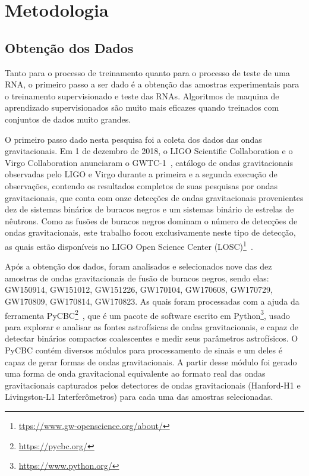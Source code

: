 \chapter{Metodologia}

\section{Obtenção dos Dados}

Tanto para o processo de treinamento quanto para o processo de teste de uma RNA, o primeiro passo a ser dado é a obtenção das amostras experimentais para o treinamento supervisionado e teste das RNAs. Algoritmos de maquina de aprendizado supervisionados são muito mais eficazes quando treinados com conjuntos de dados muito grandes.

O primeiro passo dado nesta pesquisa foi a coleta dos dados das ondas gravitacionais. Em 1 de dezembro de 2018, o LIGO Scientific Collaboration e o Virgo Collaboration anunciaram o GWTC-1~\cite{Abbott_2019}, catálogo de ondas gravitacionais observadas pelo LIGO e Virgo durante a primeira e a segunda execução de observações, contendo os resultados completos de suas pesquisas por ondas gravitacionais, que conta com onze detecções de ondas gravitacionais provenientes dez de sistemas binários de buracos negros e um sistemas binário de estrelas de nêutrons. Como as fusões de buracos negros dominam o número de detecções de ondas gravitacionais, este trabalho focou exclusivamente neste tipo de detecção, as quais estão disponíveis no LIGO Open Science Center (LOSC)\footnote{\href{https://www.gw-openscience.org/about/}{ttps://www.gw-openscience.org/about/}}~\cite{vallisneri2015ligo}. 

Após a obtenção dos dados, foram analisados e selecionados nove das dez amostras de ondas gravitacionais de fusão de buracos negros, sendo elas: GW150914, GW151012, GW151226, GW170104, GW170608, GW170729, GW170809, GW170814, GW170823. As quais foram processadas com a ajuda da ferramenta PyCBC\footnote{\href{https://pycbc.org/}{https://pycbc.org/}}~\cite{alex_nitz_2019_2801307}, que é um pacote de software escrito em Python\footnote{\href{https://www.python.org/}{https://www.python.org/}}, usado para explorar e analisar as fontes astrofísicas de ondas gravitacionais, e capaz de detectar binários compactos coalescentes e medir seus parâmetros astrofísicos. O PyCBC contém diversos módulos para processamento de sinais e um deles é capaz de gerar formas de ondas gravitacionais. A partir desse módulo foi gerado uma forma de onda gravitacional equivalente ao formato real das ondas gravitacionais capturados pelos detectores de ondas gravitacionais (Hanford-H1 e Livingston-L1 Interferômetros) para cada uma das amostras selecionadas.

